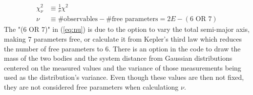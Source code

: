 \documentclass[10pt,preprint]{aastex}
\begin{document}
\begin{subequations}
\begin{align}\label{eq:reducedChiSquare}
\chi^{2}_{\nu}& \equiv \frac{1}{\nu}\chi^{2}\\
\label{eq:nu}
\nu& \equiv \#\text{observables}-\#\text{free parameters}=2E-(\text{6 OR 7})
\end{align}
\end{subequations}
The "(6 OR 7)" in (\ref{eq:nu}) is due to the option to vary the total semi-major axis, making 7 parameters free, or calculate it from Kepler's third law which reduces the number of free parameters to 6.  There is an option in the code to draw the mass of the two bodies and the system distance from Gaussian distributions centered on the measured values and the variance of those measurements being used as the distribution's variance.  Even though these values are then not fixed, they are not considered free parameters when calculationg $\nu$.
\pagebreak
\end{document}
